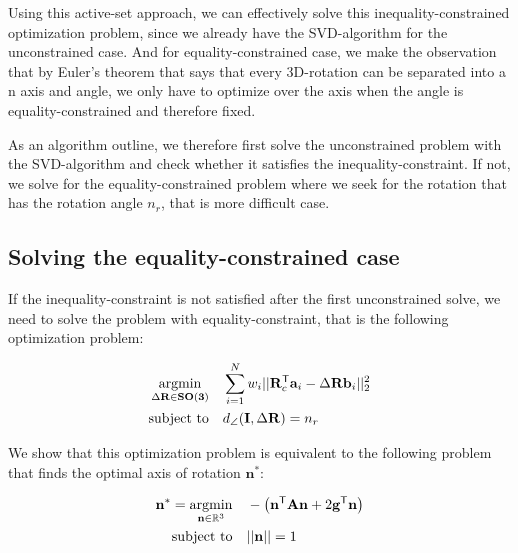 Using this active-set approach, we can effectively solve this inequality-constrained optimization problem, since we already have the SVD-algorithm for the unconstrained case. And for equality-constrained case, we make the observation that by Euler's theorem that says that every 3D-rotation can be separated into a n axis and angle, we only have to optimize over the axis when the angle is equality-constrained and therefore fixed.

As an algorithm outline, we therefore first solve the unconstrained problem with the SVD-algorithm and check whether it satisfies the inequality-constraint. If not, we solve for the equality-constrained problem where we seek for the rotation that has the rotation angle $n_r$, that is more difficult case.


\subsection{Solving the equality-constrained case}

If the inequality-constraint is not satisfied after the first unconstrained solve, we need to solve the problem with equality-constraint, that is the following optimization problem: 

\begin{equation}
	\label{eq:tls-rwls-eq}
	\begin{aligned}
		\operatorname*{argmin}_{\Delta \mathbf{R} \in \mathbf{SO(3)}}  \quad &\sum_{i=1}^{N} w_i ||\mathbf{R}_c^{\mathsf{T}} \mathbf{a}_i - \Delta\mathbf{R} \mathbf{b}_i ||_2^2 \\
		\text{subject to} \quad &d_{\angle}(\mathbf{I}, \Delta\mathbf{R}) = n_r
	\end{aligned}
\end{equation}

We show that this optimization problem is equivalent to the following problem that finds the optimal axis of rotation $\mathbf{n}^*$:

\begin{equation}
	\begin{aligned}
		\label{eq:eq-constrained-prob-ev}
		\mathbf{n}^* = \operatorname*{argmin}_{\mathbf{n} \in \mathbb{R}^3} \quad &-\left(\mathbf{n}^{\mathsf{T}} \mathbf{A} \mathbf{n} + 2 \mathbf{g}^{\mathsf{T}} \mathbf{n} \right)\\
		\text{subject to} \quad &|| \mathbf{n}|| = 1\\
	\end{aligned}
\end{equation}

